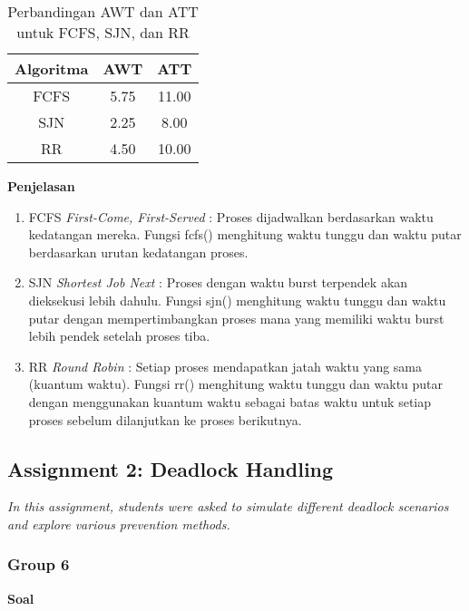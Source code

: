 \documentclass[12pt]{article}
\begin{document}
\begin{table}
\centering
\begin{tabular}{|c|c|c|}
\hline
\textbf{Algoritma} & \textbf{AWT} & \textbf{ATT} \\ \hline
FCFS               & 5.75                                & 11.00                                  \\ \hline
SJN                & 2.25                                & 8.00                                  \\ \hline
RR                 & 4.50                                & 10.00                                 \\ \hline
\end{tabular}
\caption{Perbandingan AWT dan ATT untuk FCFS, SJN, dan RR}
\label{tab:comparison}
\end{table}
\textbf{Penjelasan}
\begin{enumerate}
    \item{FCFS \textit{First-Come, First-Served}} : Proses dijadwalkan berdasarkan waktu kedatangan mereka. Fungsi fcfs() menghitung waktu tunggu dan waktu putar berdasarkan urutan kedatangan proses.
    \item{SJN \textit{Shortest Job Next}} : Proses dengan waktu burst terpendek akan dieksekusi lebih dahulu. Fungsi sjn() menghitung waktu tunggu dan waktu putar dengan mempertimbangkan proses mana yang memiliki waktu burst lebih pendek setelah proses tiba.
    \item{RR \textit{Round Robin}} : Setiap proses mendapatkan jatah waktu yang sama (kuantum waktu). Fungsi rr() menghitung waktu tunggu dan waktu putar dengan menggunakan kuantum waktu sebagai batas waktu untuk setiap proses sebelum dilanjutkan ke proses berikutnya.
\end{enumerate}

\subsection{Assignment 2: Deadlock Handling}
\textit{In this assignment, students were asked to simulate different deadlock scenarios and explore various prevention methods.}

\subsubsection{Group 6}
\vspace{0.5cm}
\textbf{Soal}
\vspace{0.5cm}
\end{document}
